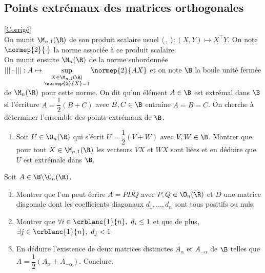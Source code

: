 \documentclass[8pt]{book}
\begin{document}
\subsection{Points extrémaux des matrices orthogonales }
\label{Points extrémaux des matrices orthogonales}
\textcolor{blue}{\hyperref[Points extrémaux des matrices orthogonales corrigé]{[Corrigé]}}\\
On munit $\M_{n,1}(\R)$ de son produit scalaire usuel $\langle\ ,\ \rangle:(X,Y)\mapsto X^\top Y$. On note $\normep{2}{\cdot}$ la norme associée à ce produit scalaire.\\
On munit ensuite $\M_n(\R)$ de la norme subordonnée ${|||\cdot|||}:A\mapsto\sup\limits_{\substack{X\in \M_{n,1}(\R)\\\normep{2}{X}=1}}\normep{2}{AX}$ et on note $\B$ la boule unité fermée de $\M_n(\R)$ pour cette norme. On dit qu'un élément $A\in \B$ est extrémal dans $\B$ si l'écriture $A=\dfrac{1}{2}(B+C)$ avec $B,C\in \B$ entraîne $A=B=C$. On cherche à déterminer l'ensemble des points extrémaux de $\B$.
\begin{enumerate}
	\item Soit $U\in \O_n(\R)$ qui s'écrit $U=\dfrac{1}{2}(V+W)$ avec $V,W\in \B$. Montrer que pour tout $X\in \M_{n,1}(\R)$ les vecteurs $VX$ et $WX$ sont liées et en déduire que $U$ est extrémale dans $\B$.
\end{enumerate}
Soit $A\in \B\backslash\O_n(\R)$.
\begin{enumerate}[resume]
	\item Montrer que l'on peut écrire $A=PDQ$ avec $P,Q\in \O_n(\R)$ et $D$ une matrice diagonale dont les coefficients diagonaux $d_1,\dots,d_n$ sont tous positifs ou nuls.
	\item Montrer que $\forall i\in \crblanc{1}{n},\ d_i\leq 1$ et que de plus, $\exists j\in \crblanc{1}{n},\ d_j<1$.
	\item En déduire l'existence de deux matrices distinctes $A_\alpha$ et $A_{-\alpha}$ de $\B$ telles que $A=\dfrac{1}{2}(A_\alpha+A_{-\alpha})$. Conclure.
\end{enumerate}
\end{document}
